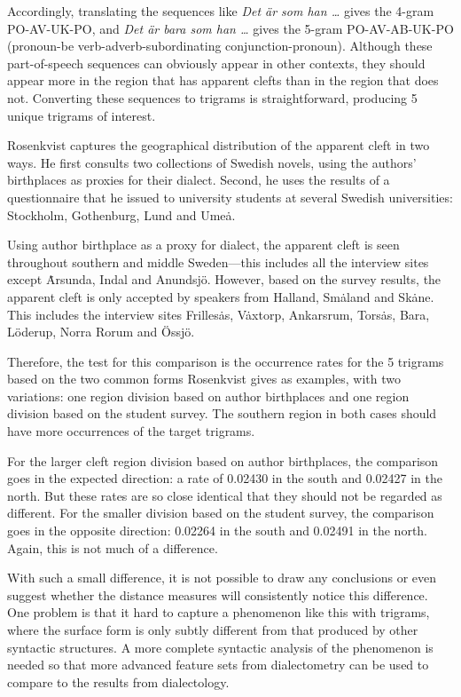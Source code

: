 Accordingly, translating the sequences like {\it Det \"ar som han
  \ldots} gives the 4-gram PO-AV-UK-PO, and {\it Det \"ar bara som han
  \ldots} gives the 5-gram PO-AV-AB-UK-PO (pronoun-be
verb-adverb-subordinating conjunction-pronoun). Although these
part-of-speech sequences can obviously appear in other contexts, they
should appear more in the region that has apparent clefts than in the
region that does not. Converting these sequences to trigrams is
straightforward, producing 5 unique trigrams of interest.

Rosenkvist captures the geographical distribution of the apparent
cleft in two ways. He first consults two collections of Swedish
novels, using the authors' birthplaces as proxies for their
dialect. Second, he uses the results of a questionnaire that he issued
to university students at several Swedish universities: Stockholm,
Gothenburg, Lund and Ume\.a.

Using author birthplace as a proxy for dialect, the apparent cleft is
seen throughout southern and middle Sweden---this includes all the
interview sites except \.Arsunda, Indal and Anundsj\"o. However, based
on the survey results, the apparent cleft is only accepted by speakers
from Halland, Sm\.aland and Sk\.ane. This includes the interview sites
Frilles\.as, V\.axtorp, Ankarsrum, Tors\.as, Bara, L\"oderup, Norra
Rorum and \"Ossj\"o.

Therefore, the test for this comparison is the occurrence rates
for the 5 trigrams based on the two common forms Rosenkvist gives as
examples, with two variations: one region division based on author
birthplaces and one region division based on the student survey. The
southern region in both cases should have more occurrences of the
target trigrams.

For the larger cleft region division based on author birthplaces, the
comparison goes in the expected direction: a rate of 0.02430 in the
south and 0.02427 in the north. But these rates are so close identical
that they should not be regarded as different. For the smaller division
based on the student survey, the comparison goes in the opposite
direction: 0.02264 in the south and 0.02491 in the north. Again, this
is not much of a difference.

With such a small difference, it is not possible to draw any
conclusions or even suggest whether the distance measures will consistently
notice this difference. One problem is that it hard to capture a
phenomenon like this with trigrams, where the surface form is only
subtly different from that produced by other syntactic structures. A
more complete syntactic analysis of the phenomenon is needed so that
more advanced feature sets from dialectometry can be used to compare
to the results from dialectology.

